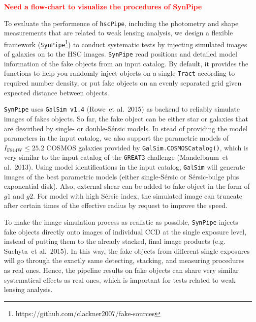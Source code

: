 \documentclass{pasj01}
\newcommand{\todo}[1]{\textcolor{red} {\textbf{#1}}}
\begin{document}
    \todo{Need a flow-chart to visualize the procedures of SynPipe}

    To evaluate the performence of \texttt{hscPipe}, including the photometry and shape 
    measurements that are related to weak lensing analysis, we design a flexible framework 
    (\texttt{SynPipe}\footnote{https://github.com/clackner2007/fake-sources}) to conduct 
    systematic tests by injecting simulated images of galaxies on to the HSC images.  
    \texttt{SynPipe} read positions and detailed model information of the fake objects from an
    input catalog.  By default, it provides the functions to help you randomly inject objects 
    on a single \texttt{Tract} according to required number density, or put fake objects on 
    an evenly separated grid given expected distance between objects. 

    \texttt{SynPipe} uses \texttt{GalSim\ v1.4} (Rowe\ et al.\ 2015) as backend to reliably
    simulate images of fakes objects.  So far, the fake object can be either star or galaxies
    that are described by single- or double-{S\'{e}rsic} models.  In stead of providing the
    model parameters in the input catalog, we also support the parametric models of
    $I_{\mathrm{F814W}} \leq 25.2$ COSMOS galaxies provided by
    \texttt{GalSim.COSMOSCatalog()}, which is very similar to the input catalog of the
    \texttt{GREAT3} challenge (Mandelbaum\ et al.\ 2013).   Using model identifications in the
    input catalog, \texttt{GalSim} will generate images of the best parametric models (either
    single-{S\'{e}rsic} or {S\'{e}rsic}-bulge plus exponential disk).  Also, external shear
    can be added to fake object in the form of $g1$ and $g2$.  For model with high
    {S\'{e}rsic} index, the simulated image can truncate after certain times of the effective
    radius by request to improve the speed.  

    To make the image simulation process as realistic as possible, \texttt{SynPipe} injects
    fake objects directly onto images of individual CCD at the single exposure level, instead
    of putting them to the already stacked, final image products (e.g. Suchyta\ et al.\ 2015).
    In this way, the fake objects from different single exposures will go through the exactly
    same detecting, stacking, and measuring procedures as real ones.  Hence, the pipeline
    results on fake objects can share very similar systematical effects as real ones, which is
    important for tests related to weak lensing analysis. 
\end{document}
